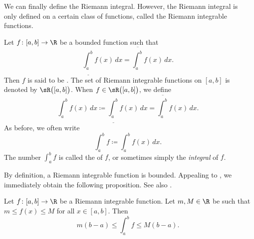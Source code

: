 We can finally define the Riemann integral.  However, the Riemann
integral is only defined on a certain class of functions, called the
Riemann integrable functions.

\begin{defn}
Let $f \colon [a,b] \to \R$ be a bounded function such that
\begin{equation*}
\underline{\int_a^b} f(x)\,dx = \overline{\int_a^b} f(x)\,dx .
\end{equation*}
Then $f$ is said to be \emph{}.
The set of Riemann integrable functions on $[a,b]$ is denoted
by $\sR\bigl([a,b]\bigr)$.
When $f \in \sR\bigl([a,b]\bigr)$, we define
\begin{equation*}
\int_a^b f(x)\,dx \coloneqq 
\underline{\int_a^b} f(x)\,dx = \overline{\int_a^b} f(x)\,dx .
\end{equation*}
As before, we often write
\begin{equation*}
\int_a^b f \coloneqq \int_a^b f(x)\,dx.
\end{equation*}
The number $\int_a^b f$ is called the \emph{}
of $f$, or sometimes simply the \emph{integral} of $f$.
\end{defn}

By definition, a Riemann integrable function is bounded.
Appealing to , we immediately obtain
the following proposition.  See also .

\begin{prop} \label{intbound:prop}
Let $f \colon [a,b] \to \R$ be a Riemann integrable function.
Let $m, M \in \R$ be 
such that $m \leq f(x) \leq M$ for all $x \in [a,b]$.  Then
\begin{equation*}
m(b-a) \leq
\int_a^b f
\leq M(b-a) .
\end{equation*}
\end{prop}
\begin{myfigureht}
\caption{The area under the curve is bounded from above by
the area of the entire rectangle, $M(b-a)$, and from below by
the area of the shaded part, $m(b-a)$.\label{fig:integralminmax}}
\end{myfigureht}




